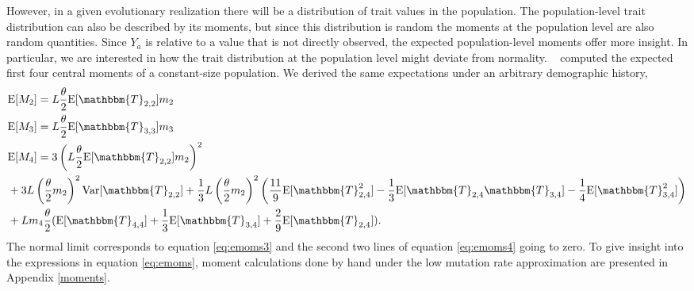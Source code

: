 However, in a given evolutionary realization there will be a distribution of
trait values in the population. The population-level trait distribution can also
be described by its moments, but since this distribution is random the moments
at the population level are also random quantities. Since $Y_a$ is relative to a
value that is not directly observed, the expected population-level moments offer
more insight. In particular, we are interested in how the trait distribution at
the population level might deviate from normality. ~\citet{Schraiber2015}
computed the expected first four central moments of a constant-size population.
We derived the same expectations under an arbitrary demographic history,
\begin{subequations} \label{eq:emoms}
\begin{align}
  &\E[M_2] = L \T \E[\mathbbm{T}_{2,2}] m_2 \label{eq:emoms2}\\
  &\E[M_3] = L \T \E[\mathbbm{T}_{3,3}] m_3  \label{eq:emoms3}\\
  &\E[M_4] = 3\left(L \T \E[\mathbbm{T}_{2,2}] m_2\right)^2 \nonumber \\
  &+ 3L \left(\T m_2\right)^2\Var[\mathbbm{T}_{2,2}] + \frac{1}{3}
  L \left(\T m_2\right)^2
    \left( \frac{11}{9} \E[\mathbbm{T}_{2,4}^2]-\frac{1}{3}\E[\mathbbm{T}_{2,4}\mathbbm{T}_{3,4}]-
    \frac{1}{4}\E[\mathbbm{T}_{3,4}^2]\right) \nonumber \\
  &+ L m_4 \T ( \E[\mathbbm{T}_{4,4}] + \frac{1}{3} \E[\mathbbm{T}_{3,4}] +
    \frac{2}{9} \E[\mathbbm{T}_{2,4}] ).
  \label{eq:emoms4}
\end{align}
\end{subequations}
The normal limit corresponds to equation \eqref{eq:emoms3} and the second two
lines of equation \eqref{eq:emoms4} going to zero. To give insight into the
expressions in equation \eqref{eq:emoms}, moment calculations done by hand under
the low mutation rate approximation are presented in Appendix \ref{moments}.


